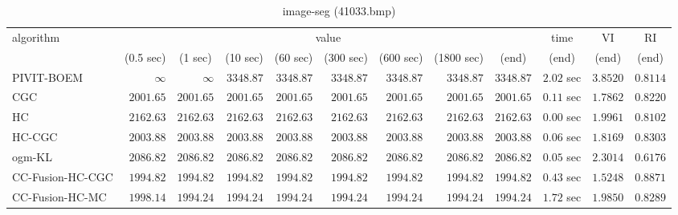 \begin{table}[H]
\scriptsize
\centering
\caption{image-seg (41033.bmp)}
\label{tab:anytimetable-image-seg-41033.bmp}
\begin{tabular}{lrrrrrrrrrrr}
\toprule
           algorithm &                                   \multicolumn{8}{c}{value} & \multicolumn{1}{c}{time}    & \multicolumn{1}{c}{VI}  & \multicolumn{1}{c}{RI} \\  
\cmidrule(lr){2-9}\cmidrule(lr){10-10} \cmidrule(lr){11-11} \cmidrule(lr){12-12}   
                     & \multicolumn{1}{c}{(0.5 sec)} & \multicolumn{1}{c}{(1 sec)} & \multicolumn{1}{c}{(10 sec)} & \multicolumn{1}{c}{(60 sec)} & \multicolumn{1}{c}{(300 sec)} & \multicolumn{1}{c}{(600 sec)} & \multicolumn{1}{c}{(1800 sec)} & \multicolumn{1}{c}{(end)} & \multicolumn{1}{c}{(end)}    & \multicolumn{1}{c}{(end)}   & \multicolumn{1}{c}{(end)}  \\ \midrule 
          PIVIT-BOEM & $\infty$ & $\infty$ & $      3348.87$ & $      3348.87$ & $      3348.87$ & $      3348.87$ & $      3348.87$ & $      3348.87$ & $         2.02$ sec    & $       3.8520$  & $       0.8114$ \\ 
                 CGC & $      2001.65$ & $      2001.65$ & $      2001.65$ & $      2001.65$ & $      2001.65$ & $      2001.65$ & $      2001.65$ & $      2001.65$ & $         0.11$ sec    & $       1.7862$  & $       0.8220$ \\ 
                  HC & $      2162.63$ & $      2162.63$ & $      2162.63$ & $      2162.63$ & $      2162.63$ & $      2162.63$ & $      2162.63$ & $      2162.63$ & $         0.00$ sec    & $       1.9961$  & $       0.8102$ \\ 
              HC-CGC & $      2003.88$ & $      2003.88$ & $      2003.88$ & $      2003.88$ & $      2003.88$ & $      2003.88$ & $      2003.88$ & $      2003.88$ & $         0.06$ sec    & $       1.8169$  & $       0.8303$ \\ 
              ogm-KL & $      2086.82$ & $      2086.82$ & $      2086.82$ & $      2086.82$ & $      2086.82$ & $      2086.82$ & $      2086.82$ & $      2086.82$ & $         0.05$ sec    & $       2.3014$  & $       0.6176$ \\ 
    CC-Fusion-HC-CGC & $      1994.82$ & $      1994.82$ & $      1994.82$ & $      1994.82$ & $      1994.82$ & $      1994.82$ & $      1994.82$ & $      1994.82$ & $         0.43$ sec    & $       1.5248$  & $       0.8871$ \\ 
     CC-Fusion-HC-MC & $      1998.14$ & $      1994.24$ & $      1994.24$ & $      1994.24$ & $      1994.24$ & $      1994.24$ & $      1994.24$ & $      1994.24$ & $         1.72$ sec    & $       1.9850$  & $       0.8289$ \\ 

\end{tabular}
\end{table}
